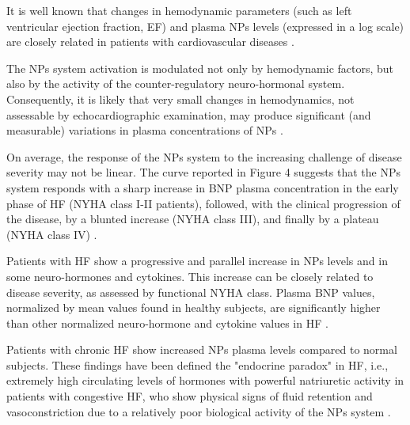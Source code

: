 \documentclass[14pt,a4paper,onecolumn]{extarticle}
\begin{document}
It is well known that changes in hemodynamic parameters (such as left ventricular ejection fraction, EF) and plasma NPs levels (expressed in a log scale) are closely related in patients with cardiovascular diseases  \citep{bib32} \citep{bib33} \citep{bib34} \citep{bib35}  \citep{bib360} \citep{bib363} \citep{bib364}. %


The NPs system activation is modulated not only by hemodynamic factors, but also by the activity of the counter-regulatory neuro-hormonal system. Consequently, it is likely that very small changes in hemodynamics, not assessable by echocardiographic examination, may produce significant (and measurable) variations in plasma concentrations of NPs \citep{bib360}. %

On average, the response of the NPs system to the increasing challenge of disease severity may not be linear. The curve reported in Figure 4 suggests that the NPs system responds with a sharp increase in BNP plasma concentration in the early phase of HF (NYHA class I-II patients), followed, with the clinical progression of the disease, by a blunted increase (NYHA class III), and finally by a plateau (NYHA class IV) \citep{bib333}. %

Patients with HF show a progressive and parallel increase in NPs levels and in some neuro-hormones and cytokines. This increase can be closely related to disease severity, as assessed by functional NYHA class. Plasma BNP values, normalized by mean values found in healthy subjects, are significantly higher than other normalized neuro-hormone and cytokine values in HF \citep{bib360}. %

Patients with chronic HF show increased NPs plasma levels compared to normal subjects. These findings have been defined the "endocrine paradox" in HF, i.e., extremely high circulating levels of hormones with powerful natriuretic activity in patients with congestive HF, who show physical signs of fluid retention and vasoconstriction due to a relatively poor biological activity of the NPs system \citep{bib36}. %
\end{document}
